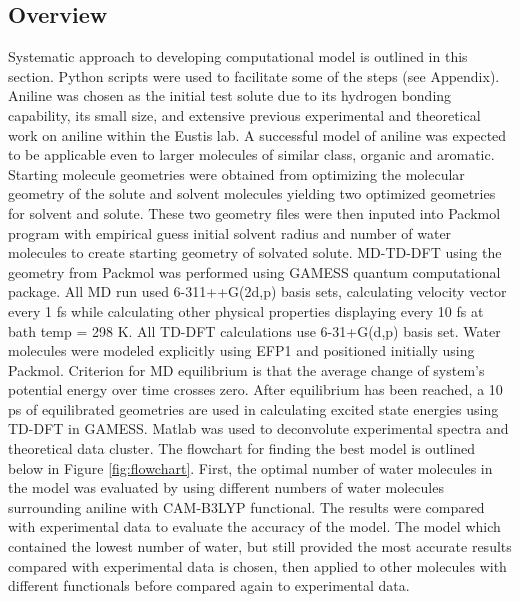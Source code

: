 \documentclass[
journal=jpcbfk, %
manuscript=article]{achemso}
\begin{document}
	\subsection{Overview} \label{step1}
	Systematic approach to developing computational model is outlined in this section. Python\cite{python} scripts were used to facilitate some of the steps (see Appendix). Aniline was chosen as the initial test solute due to its hydrogen bonding capability, its small size, and extensive previous experimental and theoretical work on aniline within the Eustis lab. A successful model of aniline was expected to be applicable even to larger molecules of similar class, organic and aromatic. Starting molecule geometries were obtained from optimizing the molecular geometry of the solute and solvent molecules yielding two optimized geometries for solvent and solute. These two geometry files were then inputed into Packmol program\cite{Martinez2009} with empirical guess initial solvent radius and number of water molecules to create starting geometry of solvated solute. MD-TD-DFT using the geometry from Packmol was performed using GAMESS quantum computational package. All MD run used 6-311++G(2d,p) basis sets, calculating velocity vector every 1 fs while calculating other physical properties displaying every 10 fs at bath temp = 298 K. All TD-DFT calculations use 6-31+G(d,p) basis set. Water molecules were modeled explicitly using EFP1 and positioned initially using Packmol. Criterion for MD equilibrium is that the average change of system’s potential energy over time crosses zero. After equilibrium has been reached, a 10 ps of equilibrated geometries are used in calculating excited state energies using TD-DFT in GAMESS. Matlab\cite{matlab} was used to deconvolute experimental spectra and theoretical data cluster.
	The flowchart for finding the best model is outlined below in Figure \ref{fig:flowchart}. First, the optimal number of water molecules in the model was evaluated by using different numbers of water molecules surrounding aniline with CAM-B3LYP functional. The results were compared with experimental data to evaluate the accuracy of the model. The model which contained the lowest number of water, but still provided the most accurate results compared with experimental data is chosen, then applied to other molecules with different functionals before compared again to experimental data. 
	
\end{document}
